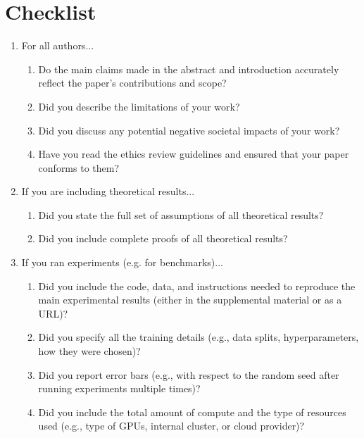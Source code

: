 \section*{Checklist}
\begin{enumerate}

\item For all authors...
\begin{enumerate}
  \item Do the main claims made in the abstract and introduction accurately reflect the paper's contributions and scope?
    \answerYes{}
  \item Did you describe the limitations of your work?
  \item Did you discuss any potential negative societal impacts of your work?
  \item Have you read the ethics review guidelines and ensured that your paper conforms to them?
    \answerYes{}
\end{enumerate}

\item If you are including theoretical results...
\begin{enumerate}
  \item Did you state the full set of assumptions of all theoretical results?
    \answerNA{}
	\item Did you include complete proofs of all theoretical results?
    \answerNA{}
\end{enumerate}

\item If you ran experiments (e.g. for benchmarks)...
\begin{enumerate}
  \item Did you include the code, data, and instructions needed to reproduce the main experimental results (either in the supplemental material or as a URL)?
    \answerYes{}
  \item Did you specify all the training details (e.g., data splits, hyperparameters, how they were chosen)?
	\item Did you report error bars (e.g., with respect to the random seed after running experiments multiple times)?
    \answerNA{}
	\item Did you include the total amount of compute and the type of resources used (e.g., type of GPUs, internal cluster, or cloud provider)?
\end{enumerate}


\end{enumerate}
